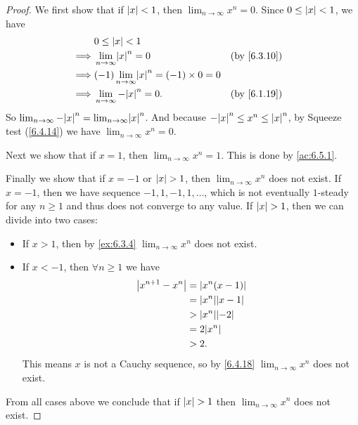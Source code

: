 \begin{proof}
  We first show that if \(\left\lvert x\right\rvert < 1\), then \(\lim_{n \to \infty} x^n = 0\).
  Since \(0 \leq \left\lvert x\right\rvert < 1\), we have
  \begin{align*}
             & 0 \leq \abs{x} < 1                                                     \\
    \implies & \lim_{n \to \infty} \abs{x}^n = 0                     &  & \by{6.3.10} \\
    \implies & (-1)\lim_{n \to \infty} \abs{x}^n = (-1) \times 0 = 0                  \\
    \implies & \lim_{n \to \infty} -\abs{x}^n = 0.                   &  & \by{6.1.19}
  \end{align*}
  So \(\lim_{n \to \infty} -\abs{x}^n = \lim_{n \to \infty} \abs{x}^n\).
  And because \(-\abs{x}^n \leq x^n \leq \abs{x}^n\), by Squeeze test (\cref{6.4.14}) we have \(\lim_{n \to \infty} x^n = 0\).

  Next we show that if \(x = 1\), then \(\lim_{n \to \infty} x^n = 1\).
  This is done by \cref{ac:6.5.1}.

  Finally we show that if \(x = -1\) or \(\left\lvert x\right\rvert > 1\), then \(\lim_{n \to \infty} x^n\) does not exist.
  If \(x = -1\), then we have sequence \(-1, 1, -1, 1, \dots\), which is not eventually \(1\)-steady for any \(n \geq 1\) and thus does not converge to any value.
  If \(\left\lvert x\right\rvert > 1\), then we can divide into two cases:
  \begin{itemize}
    \item If \(x > 1\), then by \cref{ex:6.3.4} \(\lim_{n \to \infty} x^n\) does not exist.
    \item If \(x < -1\), then \(\forall n \geq 1\) we have
          \begin{align*}
            \abs{x^{n + 1} - x^n} & = \abs{x^n(x - 1)}     \\
                                  & = \abs{x^n}\abs{x - 1} \\
                                  & > \abs{x^n}\abs{-2}    \\
                                  & = 2\abs{x^n}           \\
                                  & > 2.
          \end{align*}
          This means \(x\) is not a Cauchy sequence, so by \cref{6.4.18} \(\lim_{n \to \infty} x^n\) does not exist.
  \end{itemize}
  From all cases above we conclude that if \(\left\lvert x\right\rvert > 1\) then \(\lim_{n \to \infty} x^n\) does not exist.
\end{proof}

